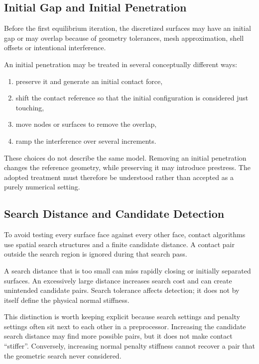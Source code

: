 \subsection{Initial Gap and Initial Penetration}

Before the first equilibrium iteration, the discretized surfaces may have an
initial gap or may overlap because of geometry tolerances, mesh approximation,
shell offsets or intentional interference.

An initial penetration may be treated in several conceptually different ways:

\begin{enumerate}
    \item preserve it and generate an initial contact force,
    \item shift the contact reference so that the initial configuration is
        considered just touching,
    \item move nodes or surfaces to remove the overlap,
    \item ramp the interference over several increments.
\end{enumerate}

These choices do not describe the same model. Removing an initial penetration
changes the reference geometry, while preserving it may introduce prestress.
The adopted treatment must therefore be understood rather than accepted as a
purely numerical setting.

\subsection{Search Distance and Candidate Detection}

To avoid testing every surface face against every other face, contact algorithms
use spatial search structures and a finite candidate distance. A contact pair
outside the search region is ignored during that search pass.

A search distance that is too small can miss rapidly closing or initially
separated surfaces. An excessively large distance increases search cost and can
create unintended candidate pairs. Search tolerance affects detection; it does
not by itself define the physical normal stiffness.


\begin{notebooknote}
This distinction is worth keeping explicit because search settings and penalty
settings often sit next to each other in a preprocessor. Increasing the candidate
search distance may find more possible pairs, but it does not make contact
``stiffer''. Conversely, increasing normal penalty stiffness cannot recover a
pair that the geometric search never considered.
\end{notebooknote}


